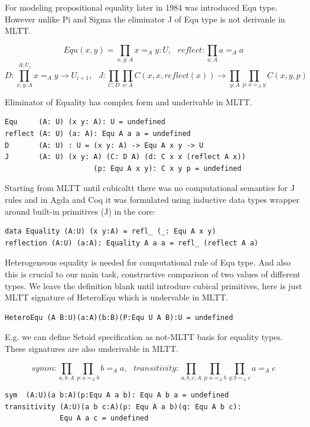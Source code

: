 \documentclass{svproc}
\begin{document}
For modeling propositional equality later in 1984 was introduced Equ type.
However unlike Pi and Sigma the eliminator J of Equ type is not derivanle in MLTT.

$$Equ(x,y) = \prod_{x,y:A} x =_A y : U,\ \ \ 
  reflect : \prod_{a:A} a =_A a$$
$$D : \prod_{x,y:A}^{A:U_i} x =_A y \rightarrow U_{i+1},\ \ \ 
  J : \prod_{C: D} \prod_{x:A} C(x,x,reflect(x)) \rightarrow \prod_{y:A} \prod_{p:x=_A y} C(x,y,p)$$

Eliminator of Equality has complex form and underivable in MLTT.

\begin{lstlisting}[mathescape=true]
Equ     (A: U) (x y: A): U = undefined
reflect (A: U) (a: A): Equ A a a = undefined
D       (A: U) : U = (x y: A) -> Equ A x y -> U
J       (A: U) (x y: A) (C: D A) (d: C x x (reflect A x))
                     (p: Equ A x y): C x y p = undefined
\end{lstlisting}

Starting from MLTT until cubicaltt there was no computational semantics
for J rules and in Agda and Coq it was formulated using inductive data types
wrapper around built-in primitives (J) in the core:

\begin{lstlisting}[mathescape=true]
data Equality (A:U) (x y:A) = refl_ (_: Equ A x y)
reflection (A:U) (a:A): Equality A a a = refl_ (reflect A a)
\end{lstlisting}

Heterogeneous equality is needed for computational rule of Equ type.
And also this is crucial to our main task, constructive
comparison of two values of different types. We leave the definition blank
until introdure cubical primitives, here is just MLTT signature of HeteroEqu
which is undervable in MLTT.

\begin{lstlisting}[mathescape=true]
HeteroEqu (A B:U)(a:A)(b:B)(P:Equ U A B):U = undefined
\end{lstlisting}

E.g. we can define Setoid specification \cite{Bishop67} as not-MLTT basis
for equality types. These signatures are also underivable in MLTT.

$$symm : \prod_{a,b:A} \prod_{p:a =_A b} b =_A a,\ \ \ 
  transitivity : \prod_{a,b,c: A} \prod_{p: a =_A b} \prod_{q: b =_A c} a =_A c$$

\begin{lstlisting}[mathescape=true]
sym  (A:U)(a b:A)(p:Equ A a b): Equ A b a = undefined
transitivity (A:U)(a b c:A)(p: Equ A a b)(q: Equ A b c):
             Equ A a c = undefined
\end{lstlisting}
\end{document}
